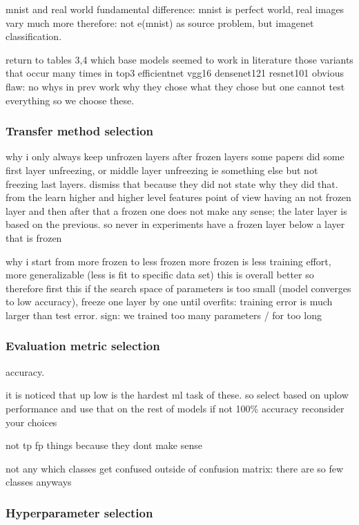 \documentclass{article}
\begin{document}
mnist and real world fundamental difference: mnist is perfect world, real images vary much more \cite{alexnet}
therefore: not e(mnist) as source problem, but imagenet classification.

return to tables 3,4 which base models seemed to work in literature
those variants that occur many times in top3
efficientnet
vgg16
densenet121
resnet101
obvious flaw: no whys in prev work why they chose what they chose but 
one cannot test everything so we choose these.

\subsubsection{Transfer method selection}

why i only always keep unfrozen layers after frozen layers
some papers did some first layer unfreezing, or middle layer unfreezing ie something else 
but not freezing last layers. dismiss that because 
they did not state why they did that. from the learn higher and higher level features point of view 
having an not frozen layer and then after that a frozen one does not make any sense; the later 
layer is based on the previous. so never in experiments have a frozen layer below a layer that is frozen

why i start from more frozen to less frozen
more frozen is less training effort, more generalizable (less is fit to specific data set)
this is overall better so therefore first this
if the search space of parameters is too small (model converges to low accuracy), freeze one layer by one 
until overfits: training error is much larger than test error. sign: we trained too many parameters / for too long

\subsubsection{Evaluation metric selection}

accuracy.

it is noticed that up low is the hardest ml task of these. so select based on uplow performance and use that on the rest of models
if not 100\% accuracy reconsider your choices

not tp fp things because they dont make sense

not any which classes get confused outside of confusion matrix: there are so few classes anyways

\subsubsection{Hyperparameter selection}
\end{document}
